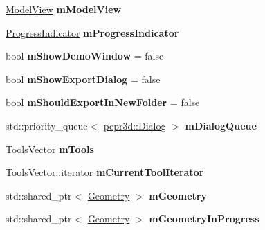\begin{DoxyCompactItemize}
\mbox{\hyperlink{classpepr3d_1_1_model_view}{Model\+View}} {\bfseries m\+Model\+View}
\item 
\mbox{\label{classpepr3d_1_1_main_application_a584e07294abcf01b259bfa7b0e326965}} 
\mbox{\hyperlink{classpepr3d_1_1_progress_indicator}{Progress\+Indicator}} {\bfseries m\+Progress\+Indicator}
\item 
\mbox{\label{classpepr3d_1_1_main_application_a8197cbb3456a81fbdb0d4cf501e85518}} 
bool {\bfseries m\+Show\+Demo\+Window} = false
\item 
\mbox{\label{classpepr3d_1_1_main_application_a953650b3249eba753950690b8a45f278}} 
bool {\bfseries m\+Show\+Export\+Dialog} = false
\item 
\mbox{\label{classpepr3d_1_1_main_application_a7608d3408a92ce6e9821a7e05498c29b}} 
bool {\bfseries m\+Should\+Export\+In\+New\+Folder} = false
\item 
\mbox{\label{classpepr3d_1_1_main_application_a5fc071f761e157f98066cf1ca9f3b2de}} 
std\+::priority\+\_\+queue$<$ \mbox{\hyperlink{classpepr3d_1_1_dialog}{pepr3d\+::\+Dialog}} $>$ {\bfseries m\+Dialog\+Queue}
\item 
\mbox{\label{classpepr3d_1_1_main_application_a350c54b92a68ddf70b7332eeecdee4b7}} 
Tools\+Vector {\bfseries m\+Tools}
\item 
\mbox{\label{classpepr3d_1_1_main_application_abd3f6abd8bd685f463606ddc6ce07c59}} 
Tools\+Vector\+::iterator {\bfseries m\+Current\+Tool\+Iterator}
\item 
\mbox{\label{classpepr3d_1_1_main_application_ad9b98e4e97ef223e56901a7adf438006}} 
std\+::shared\+\_\+ptr$<$ \mbox{\hyperlink{classpepr3d_1_1_geometry}{Geometry}} $>$ {\bfseries m\+Geometry}
\item 
\mbox{\label{classpepr3d_1_1_main_application_a5be480a3d12e8f757179949d7b9c4c3c}} 
std\+::shared\+\_\+ptr$<$ \mbox{\hyperlink{classpepr3d_1_1_geometry}{Geometry}} $>$ {\bfseries m\+Geometry\+In\+Progress}

\end{DoxyCompactItemize}
